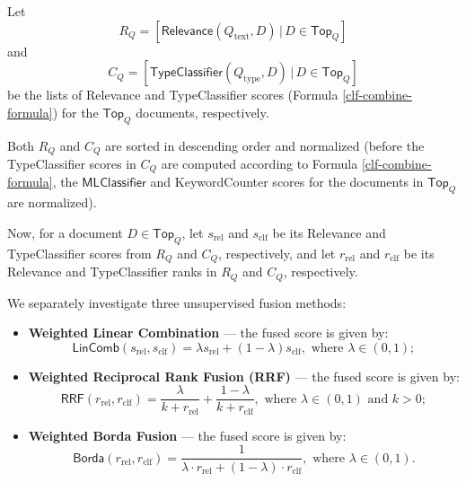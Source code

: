 Let
\[R_Q = [\textsf{Relevance}(Q_{\text{text}}, D) \,|\, D\in \textsf{Top}_Q]\]
and
\[C_Q = [\textsf{TypeClassifier}(Q_{\text{type}}, D) \,|\, D\in \textsf{Top}_Q]\]
be the lists of \textsf{Relevance} and
\textsf{TypeClassifier} scores (Formula \ref{clf-combine-formula})
for the $\textsf{Top}_Q$ documents, respectively.

Both $R_Q$ and $C_Q$ are sorted in descending order and normalized
(before the \textsf{TypeClassifier} scores in $C_Q$ are computed according to Formula \ref{clf-combine-formula}, the
$\textsf{MLClassifier}$ and \textsf{KeywordCounter} scores for the documents in $\textsf{Top}_Q$ are normalized).

Now, for a document $D\in \textsf{Top}_Q$, let $s_{\text{rel}}$ and $s_{\text{clf}}$ be its \textsf{Relevance} and \textsf{TypeClassifier}
scores from $R_Q$ and $C_Q$, respectively,
and let
$r_{\text{rel}}$ and $r_{\text{clf}}$ be its \textsf{Relevance} and \textsf{TypeClassifier} ranks in $R_Q$ and $C_Q$, respectively.

We separately investigate three unsupervised fusion methods:
\begin{itemize}

 \item \textbf{Weighted Linear Combination} --- the fused score is given by:
 \begin{equation} \label{interp-formula}
 \textsf{LinComb}(s_{\text{rel}}, s_{\text{clf}}) =
	      \lambda s_{\text{rel}} + (1-\lambda) s_{\text{clf}}, \text{ where } \lambda \in (0,1);
 \end{equation}

\item \textbf{Weighted Reciprocal Rank Fusion (RRF)} \cite{rrf} --- the fused score is given by:
 \begin{equation}\label{rrf-formula}
  \textsf{RRF}(r_{\text{rel}}, r_{\text{clf}}) =
	      \displaystyle\frac{\lambda}{k + r_{\text{rel}}} + \displaystyle\frac{1- \lambda}{k + r_{\text{clf}}},  \text{ where } \lambda \in (0,1)
  \text{ and } k>0;
 \end{equation}

 \item \textbf{Weighted Borda Fusion} \cite{borda} ---  the fused score is given by:
 \begin{equation}\label{borda-formula}
   \textsf{Borda}(r_{\text{rel}}, r_{\text{clf}}) =
	    \displaystyle\frac{1}{\lambda \cdot r_{\text{rel}} + (1-\lambda)\cdot r_{\text{clf}}},  \text{ where } \lambda \in (0,1).
 \end{equation}
  \end{itemize}

